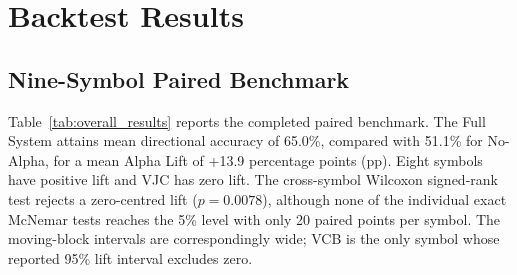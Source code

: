 \section{Backtest Results}
\label{sec:backtestresults}

\subsection{Nine-Symbol Paired Benchmark}

Table~\ref{tab:overall_results} reports the completed paired benchmark. The Full System attains mean directional accuracy of 65.0\%, compared with 51.1\% for No-Alpha, for a mean Alpha Lift of +13.9 percentage points (pp). Eight symbols have positive lift and VJC has zero lift. The cross-symbol Wilcoxon signed-rank test rejects a zero-centred lift ($p=0.0078$), although none of the individual exact McNemar tests reaches the 5\% level with only 20 paired points per symbol. The moving-block intervals are correspondingly wide; VCB is the only symbol whose reported 95\% lift interval excludes zero.

